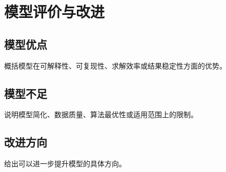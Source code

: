 \section{模型评价与改进}
\label{sec:conclusion}

\subsection{模型优点}

概括模型在可解释性、可复现性、求解效率或结果稳定性方面的优势。

\subsection{模型不足}

说明模型简化、数据质量、算法最优性或适用范围上的限制。

\subsection{改进方向}

给出可以进一步提升模型的具体方向。
